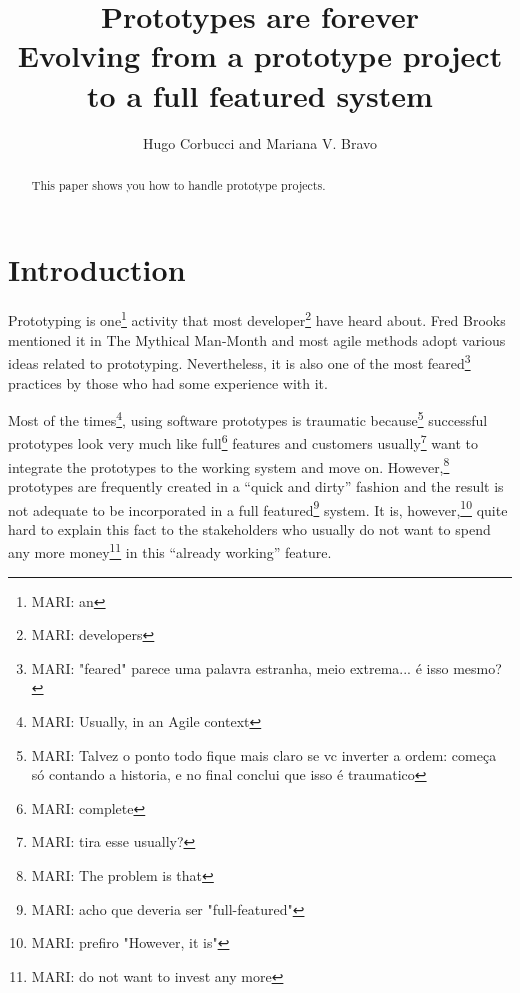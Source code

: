 \documentclass[lnbip]{svmultln}
\newcommand{\mari}[1]{\footnote{MARI: #1}}
\begin{document}
%
\mainmatter              %
%
\title{Prototypes are forever\\
  Evolving from a prototype project to a full featured system}
%
%
\author{Hugo Corbucci and Mariana V. Bravo }
%
%
%

\maketitle              %

\begin{abstract}        %

This paper shows you how to handle prototype projects.

\end{abstract}
%
\section{Introduction}

Prototyping is one\mari{an} activity that most developer\mari{developers} have
heard about. Fred Brooks mentioned it in The Mythical Man-Month
\cite{Brooks1975} and most agile methods adopt various ideas related to
prototyping. Nevertheless, it is also one of the most feared\mari{"feared"
parece uma palavra estranha, meio extrema... é isso mesmo?} practices by those
who had some experience with it.

Most of the times\mari{Usually, in an Agile context}, using software prototypes
is traumatic because\mari{Talvez o ponto todo fique mais claro se vc inverter a
ordem: começa só contando a historia, e no final conclui que isso é traumatico}
successful prototypes look very much like full\mari{complete} features and
customers usually\mari{tira esse usually?} want to integrate the prototypes to
the working system and move on. However,\mari{The problem is that} prototypes
are frequently created in a ``quick and dirty'' fashion and the result is not
adequate to be incorporated in a full featured\mari{acho que deveria ser
"full-featured"} system. It is, however,\mari{prefiro "However, it is"} quite
hard to explain this fact to the stakeholders who usually do not want to spend
any more money\mari{do not want to invest any more} in this ``already working''
feature.
\end{document}
